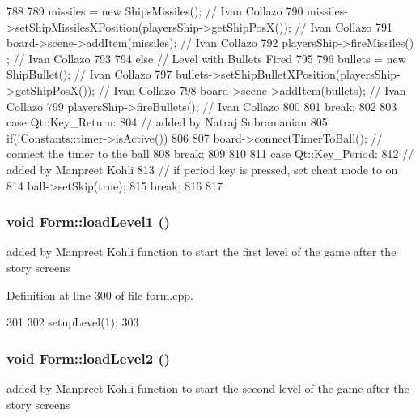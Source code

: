 \begin{DoxyCode}
{{788              {  
789                  missiles = new ShipsMissiles(); // Ivan Collazo
790                  missiles->setShipMissilesXPosition(playersShip->getShipPosX()); 
      // Ivan Collazo
791                  board->scene->addItem(missiles); // Ivan Collazo
792                  playersShip->fireMissiles()    ; // Ivan Collazo
793              }
794              else // Level with Bullets Fired
795              {
796                  bullets = new ShipBullet(); // Ivan Collazo
797                  bullets->setShipBulletXPosition(playersShip->getShipPosX()); // 
      Ivan Collazo
798                  board->scene->addItem(bullets); // Ivan Collazo
799                  playersShip->fireBullets(); // Ivan Collazo
800              }
801              break;
802 
803          case Qt::Key_Return:
804              // added by Natraj Subramanian
805              if(!Constants::timer->isActive())
806              {
807                  board->connectTimerToBall();         // connect the timer to the
       ball
808                  break;
809              }
810 
811          case Qt::Key_Period:
812              // added by Manpreet Kohli
813              // if period key is pressed, set cheat mode to on
814              ball->setSkip(true);
815              break;
816     }
817 }
\end{DoxyCode}
\hypertarget{class_form_a5db4ecbdc1a9bc4ff8927b2a5a2da69f}{
\subsubsection[{loadLevel1}]{\setlength{\rightskip}{0pt plus 5cm}void Form::loadLevel1 ()}}
\label{class_form_a5db4ecbdc1a9bc4ff8927b2a5a2da69f}
added by Manpreet Kohli function to start the first level of the game after the story screens 

Definition at line 300 of file form.cpp.


\begin{DoxyCode}
301 {
302     setupLevel(1);
303 }
\end{DoxyCode}
\hypertarget{class_form_a36f1aac890405daee948054d44200149}{
\subsubsection[{loadLevel2}]{\setlength{\rightskip}{0pt plus 5cm}void Form::loadLevel2 ()}}
\label{class_form_a36f1aac890405daee948054d44200149}
added by Manpreet Kohli function to start the second level of the game after the story screens 

